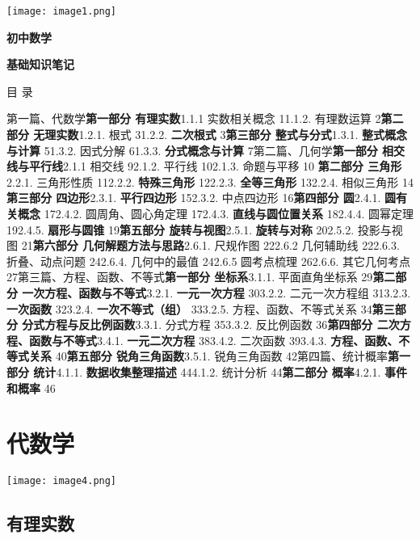 \texttt{[image: image1.png]}

\textbf{初中数学}

\textbf{基础知识笔记}

目 录

第一篇、代数学\textbf{第一部分 有理实数}1.1.1 实数相关概念 11.1.2.
有理数运算 2\textbf{第二部分 无理实数}1.2.1. 根式 31.2.2.
\textbf{二次根式} 3\textbf{第三部分 整式与分式}1.3.1.
\textbf{整式概念与计算} 51.3.2. 因式分解 61.3.3. \textbf{分式概念与计算}
7第二篇、几何学\textbf{第一部分 相交线与平行线}2.1.1 相交线 92.1.2.
平行线 102.1.3. 命题与平移 10 \textbf{第二部分 三角形}2.2.1. 三角形性质
112.2.2. \textbf{特殊三角形} 122.2.3. \textbf{全等三角形} 132.2.4.
相似三角形 14\textbf{第三部分 四边形}2.3.1. \textbf{平行四边形} 152.3.2.
中点四边形 16\textbf{第四部分 圆}2.4.1. \textbf{圆有关概念} 172.4.2.
圆周角、圆心角定理 172.4.3. \textbf{直线与圆位置关系} 182.4.4. 圆幂定理
192.4.5. \textbf{扇形与圆锥} 19\textbf{第五部分 旋转与视图}2.5.1.
\textbf{旋转与对称} 202.5.2. 投影与视图 21\textbf{第六部分
几何解题方法与思路}2.6.1. 尺规作图 222.6.2 几何辅助线 222.6.3.
折叠、动点问题 242.6.4. 几何中的最值 242.6.5 圆考点梳理 262.6.6.
其它几何考点 27第三篇、方程、函数、不等式\textbf{第一部分 坐标系}3.1.1.
平面直角坐标系 29\textbf{第二部分 一次方程、函数与不等式}3.2.1.
\textbf{一元一次方程} 303.2.2. 二元一次方程组 313.2.3. \textbf{一次函数}
323.2.4. \textbf{一次不等式（组）} 333.2.5. 方程、函数、不等式关系
34\textbf{第三部分 分式方程与反比例函数}3.3.1. 分式方程 353.3.2.
反比例函数 36\textbf{第四部分 二次方程、函数与不等式}3.4.1.
\textbf{一元二次方程} 383.4.2. 二次函数 393.4.3.
\textbf{方程、函数、不等式关系} 40\textbf{第五部分 锐角三角函数}3.5.1.
锐角三角函数 42第四篇、统计概率\textbf{第一部分 统计}4.1.1.
\textbf{数据收集整理描述} 444.1.2. 统计分析 44\textbf{第二部分
概率}4.2.1. \textbf{事件和概率} 46

\hypertarget{ux4ee3ux6570ux5b66}{%
\section{\texorpdfstring{ 代数学}{ 代数学}}\label{ux4ee3ux6570ux5b66}}

\texttt{[image: image4.png]}

\hypertarget{ux6709ux7406ux5b9eux6570}{%
\subsection{\texorpdfstring{
有理实数}{ 有理实数}}\label{ux6709ux7406ux5b9eux6570}}

